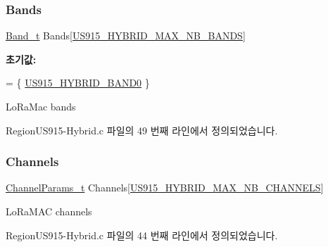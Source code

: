 \subsubsection{\texorpdfstring{Bands}{Bands}}
{\footnotesize\ttfamily \mbox{\hyperlink{group___l_o_r_a_m_a_c_ga8f49721ee96ceb52c80a896ab11a2ed8}{Band\+\_\+t}} Bands\mbox{[}\mbox{\hyperlink{group___r_e_g_i_o_n_u_s915_h_y_b_ga1ddb8622d642ac6254b04f9020ccfcf7}{U\+S915\+\_\+\+H\+Y\+B\+R\+I\+D\+\_\+\+M\+A\+X\+\_\+\+N\+B\+\_\+\+B\+A\+N\+DS}}\mbox{]}\hspace{0.3cm}{\ttfamily [static]}}

{\bfseries 초기값\+:}
\begin{DoxyCode}
=
\{
    \mbox{\hyperlink{group___r_e_g_i_o_n_u_s915_h_y_b_gaf373565fbcca15762d7f9209e78daa6c}{US915\_HYBRID\_BAND0}}
\}
\end{DoxyCode}
Lo\+Ra\+Mac bands 

Region\+U\+S915-\/\+Hybrid.\+c 파일의 49 번째 라인에서 정의되었습니다.

\mbox{\label{_region_u_s915-_hybrid_8c_a2781ea69a73fdddcc54719ec4775751f}} 
\subsubsection{\texorpdfstring{Channels}{Channels}}
{\footnotesize\ttfamily \mbox{\hyperlink{group___l_o_r_a_m_a_c_ga1360ca6f82c6d125ea43a9dad9b56184}{Channel\+Params\+\_\+t}} Channels\mbox{[}\mbox{\hyperlink{group___r_e_g_i_o_n_u_s915_h_y_b_ga977b73cbf7a5d15e2bf543fad5f35710}{U\+S915\+\_\+\+H\+Y\+B\+R\+I\+D\+\_\+\+M\+A\+X\+\_\+\+N\+B\+\_\+\+C\+H\+A\+N\+N\+E\+LS}}\mbox{]}\hspace{0.3cm}{\ttfamily [static]}}

Lo\+Ra\+M\+AC channels 

Region\+U\+S915-\/\+Hybrid.\+c 파일의 44 번째 라인에서 정의되었습니다.

\mbox{\label{_region_u_s915-_hybrid_8c_ac127b19779301713d5ed92eb03366a2d}} 
